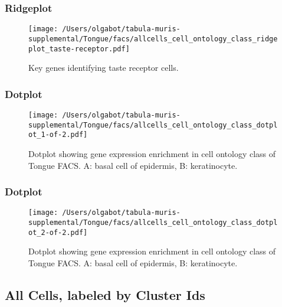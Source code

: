 \newpage
\newpage
\subsubsection{Ridgeplot}
\begin{figure}[h]
\centering
\texttt{[image: /Users/olgabot/tabula-muris-supplemental/Tongue/facs/allcells\_cell\_ontology\_class\_ridgeplot\_taste-receptor.pdf]}

\caption{Key genes identifying taste receptor cells.
}
\end{figure}


\newpage
\newpage
\subsubsection{Dotplot}
\begin{figure}[h]
\centering
\texttt{[image: /Users/olgabot/tabula-muris-supplemental/Tongue/facs/allcells\_cell\_ontology\_class\_dotplot\_1-of-2.pdf]}

\caption{ Dotplot  showing gene expression enrichment in cell ontology class of Tongue FACS. A: basal cell of epidermis, B: keratinocyte.}
\end{figure}


\newpage
\newpage
\subsubsection{Dotplot}
\begin{figure}[h]
\centering
\texttt{[image: /Users/olgabot/tabula-muris-supplemental/Tongue/facs/allcells\_cell\_ontology\_class\_dotplot\_2-of-2.pdf]}

\caption{ Dotplot  showing gene expression enrichment in cell ontology class of Tongue FACS. A: basal cell of epidermis, B: keratinocyte.}
\end{figure}


\newpage
\subsection{All Cells, labeled by Cluster Ids}
